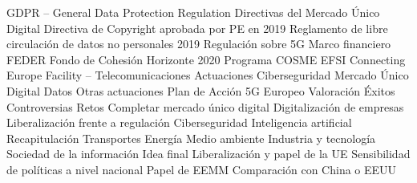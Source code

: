 \documentclass{nuevotema}
\begin{document}
\begin{esquema}[enumerate]
			\3 GDPR -- General Data Protection Regulation
			\3 Directivas del Mercado Único Digital
			\3 Directiva de Copyright aprobada por PE en 2019
			\3 Reglamento de libre circulación de datos no personales 2019
			\3 Regulación sobre 5G
		\2 Marco financiero
			\3 FEDER
			\3 Fondo de Cohesión
			\3 Horizonte 2020
			\3 Programa COSME
			\3 EFSI
			\3 Connecting Europe Facility -- Telecomunicaciones
		\2 Actuaciones
			\3 Ciberseguridad
			\3 Mercado Único Digital
			\3 Datos
			\3 Otras actuaciones
			\3 Plan de Acción 5G Europeo
		\2 Valoración
			\3 Éxitos
			\3 Controversias
		\2 Retos
			\3 Completar mercado único digital
			\3 Digitalización de empresas
			\3 Liberalización frente a regulación
			\3 Ciberseguridad
			\3 Inteligencia artificial
	\1[] 
		\2 Recapitulación
			\3 Transportes
			\3 Energía
			\3 Medio ambiente
			\3 Industria y tecnología
			\3 Sociedad de la información
		\2 Idea final
			\3 Liberalización y papel de la UE
			\3 Sensibilidad de políticas a nivel nacional
			\3 Papel de EEMM
			\3 Comparación con China o EEUU

\end{esquema}

\esquemalargo
\end{document}
